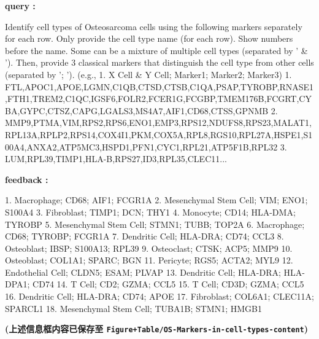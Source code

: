 \documentclass[
]{article}
\begin{document}
\begin{center}\vspace{1.5cm}\end{center}\begin{center}\begin{tcolorbox}[colback=gray!10, colframe=gray!50, width=0.9\linewidth, arc=1mm, boxrule=0.5pt]
\textbf{
query
:}

\vspace{0.5em}

    Identify cell types of Osteosarcoma cells using the
following markers separately for each row. Only provide the
cell type name (for each row). Show numbers before the
name. Some can be a mixture of multiple cell types
(separated by ' \& '). Then, provide 3 classical markers
that distinguish the cell type from other cells (separated
by '; ').  (e.g., 1. X Cell \& Y Cell; Marker1; Marker2;
Marker3) 1.
FTL,APOC1,APOE,LGMN,C1QB,CTSD,CTSB,C1QA,PSAP,TYROBP,RNASE1,FTH1,TREM2,C1QC,IGSF6,FOLR2,FCER1G,FCGBP,TMEM176B,FCGRT,CYBA,GYPC,CTSZ,CAPG,LGALS3,MS4A7,AIF1,CD68,CTSS,GPNMB
2.
MMP9,PTMA,VIM,RPS2,RPS6,ENO1,EMP3,RPS12,NDUFS8,RPS23,MALAT1,RPL13A,RPLP2,RPS14,COX4I1,PKM,COX5A,RPL8,RGS10,RPL27A,HSPE1,S100A4,ANXA2,ATP5MC3,HSPD1,PFN1,CYC1,RPL21,ATP5F1B,RPL32
3. LUM,RPL39,TIMP1,HLA-B,RPS27,ID3,RPL35,CLEC11...

\vspace{2em}


\textbf{
feedback
:}

\vspace{0.5em}

    1. Macrophage; CD68; AIF1; FCGR1A 2. Mesenchymal Stem
Cell; VIM; ENO1; S100A4 3. Fibroblast; TIMP1; DCN; THY1 4.
Monocyte; CD14; HLA-DMA; TYROBP 5. Mesenchymal Stem Cell;
STMN1; TUBB; TOP2A 6. Macrophage; CD68; TYROBP; FCGR1A 7.
Dendritic Cell; HLA-DRA; CD74; CCL3 8. Osteoblast; IBSP;
S100A13; RPL39 9. Osteoclast; CTSK; ACP5; MMP9 10.
Osteoblast; COL1A1; SPARC; BGN 11. Pericyte; RGS5; ACTA2;
MYL9 12. Endothelial Cell; CLDN5; ESAM; PLVAP 13. Dendritic
Cell; HLA-DRA; HLA-DPA1; CD74 14. T Cell; CD2; GZMA; CCL5
15. T Cell; CD3D; GZMA; CCL5 16. Dendritic Cell; HLA-DRA;
CD74; APOE 17. Fibroblast; COL6A1; CLEC11A; SPARCL1 18.
Mesenchymal Stem Cell; TUBA1B; STMN1; HMGB1

\vspace{2em}
\end{tcolorbox}
\end{center}

\textbf{(上述信息框内容已保存至 \texttt{Figure+Table/OS-Markers-in-cell-types-content})}
\end{document}
